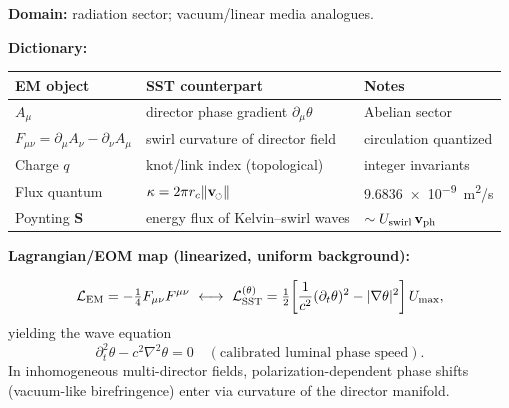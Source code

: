 \documentclass[11pt]{article}
\newcommand{\swirlarrow}{%
	\mathchoice{\mkern-2mu\scriptstyle\boldsymbol{\circlearrowleft}}%
	{\mkern-2mu\scriptstyle\boldsymbol{\circlearrowleft}}%
	{\mkern-2mu\scriptscriptstyle\boldsymbol{\circlearrowleft}}%
	{\mkern-2mu\scriptscriptstyle\boldsymbol{\circlearrowleft}}%
}
\newcommand{\vswirl}{\mathbf{v}_{\swirlarrow}}
\providecommand{\cLight}{c}
\providecommand{\rc}{r_c} %
\begin{document}
    \begin{tcolorbox}[title=Rosetta Card: Maxwell/QED $\to$ SST (multi-director swirl)]
        \small
        \textbf{Domain:} radiation sector; vacuum/linear media analogues.

        \begin{center}
            \textbf{Dictionary:}\\
        \end{center}

        \begin{tabular}{@{}lll@{}}
            \toprule
            EM object & SST counterpart & Notes \\
            \midrule
            $A_\mu$ & director phase gradient $\partial_\mu\theta$ & Abelian sector \\
            $F_{\mu\nu}=\partial_\mu A_\nu-\partial_\nu A_\mu$ & swirl curvature of director field & circulation quantized \\
            Charge $q$ & knot/link index (topological) & integer invariants \\
            Flux quantum & $\Circulation=2\pi\rc\lVert\vswirl\rVert$ & \SI{9.6836e-9}{m^2/s} \\
            Poynting $\mathbf{S}$ & energy flux of Kelvin–swirl waves & $\sim U_{\text{swirl}}\,\mathbf{v}_{\rm ph}$ \\
            \bottomrule
        \end{tabular}

        \begin{center}
            \textbf{Lagrangian/EOM map (linearized, uniform background):}\\
        \end{center}
        \[
            \mathcal{L}_{\text{EM}}=-\tfrac14 F_{\mu\nu}F^{\mu\nu}
            \ \longleftrightarrow\
            \mathcal{L}_{\text{SST}}^{(\theta)}=\tfrac12\!\left[\frac{1}{\cLight^2}(\partial_t\theta)^2-\lvert\nabla\theta\rvert^2\right]\Umax,
        \]
        yielding the wave equation
        \[
            \partial_t^2\theta-\cLight^2\nabla^2\theta=0
            \quad(\text{calibrated luminal phase speed}).
        \]
        In inhomogeneous multi-director fields, polarization-dependent phase shifts (vacuum-like birefringence) enter via curvature of the director manifold.


\end{tcolorbox}
\end{document}
